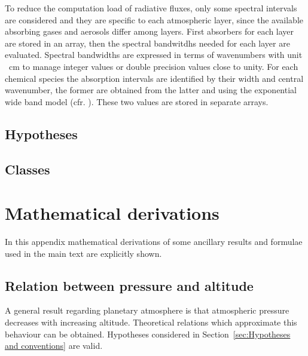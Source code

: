 \documentclass[a4paper,10pt,twocolumn,\classoptions]{article}
\begin{document}
To reduce the computation load of radiative fluxes, only some spectral intervals are considered and they are specific to each atmospheric layer, since the available absorbing gases and aerosols differ among layers. First absorbers for each layer are stored in an array, then the spectral bandwitdhs needed for each layer are evaluated. Spectral bandwidths are expressed in terms of wavenumbers with unit \unit{\per\centi\metre} to manage integer values or double precision values close to unity. For each chemical species the absorption intervals are identified by their width and central wavenumber, the former are obtained from the latter and using the exponential wide band model (cfr. \cite[360]{Modest}). These two values are stored in separate arrays.



\subsection{Hypotheses} %
\label{sec:Hypotheses}



\subsection{Classes}



\section{Mathematical derivations}
In this appendix mathematical derivations of some ancillary results and formulae used in the main text are explicitly shown.



\subsection{Relation between pressure and altitude}
\label{sec:Relation between pressure and altitude}
A general result regarding planetary atmosphere is that atmospheric pressure decreases with increasing altitude. Theoretical relations which approximate this behaviour can be obtained. Hypotheses considered in Section~\ref{sec:Hypotheses and conventions} are valid.
\end{document}
